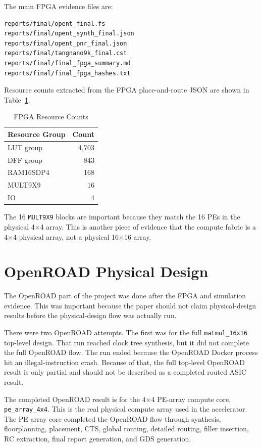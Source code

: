 \documentclass[conference]{IEEEtran}
\begin{document}
The main FPGA evidence files are:

\begin{verbatim}
reports/final/opent_final.fs
reports/final/opent_synth_final.json
reports/final/opent_pnr_final.json
reports/final/tangnano9k_final.cst
reports/final/final_fpga_summary.md
reports/final/final_fpga_hashes.txt
\end{verbatim}

Resource counts extracted from the FPGA place-and-route JSON are shown in Table~\ref{tab:fpga}.

\begin{table}[h]
\centering
\caption{FPGA Resource Counts}
\label{tab:fpga}
\begin{tabular}{lr}
\toprule
Resource Group & Count \\
\midrule
LUT group & 4,703 \\
DFF group & 843 \\
RAM16SDP4 & 168 \\
MULT9X9 & 16 \\
IO & 4 \\
\bottomrule
\end{tabular}
\end{table}

The 16 \texttt{MULT9X9} blocks are important because they match the 16 PEs in the physical 4$\times$4 array. This is another piece of evidence that the compute fabric is a 4$\times$4 physical array, not a physical 16$\times$16 array.

\section{OpenROAD Physical Design}

The OpenROAD part of the project was done after the FPGA and simulation evidence. This was important because the paper should not claim physical-design results before the physical-design flow was actually run.

There were two OpenROAD attempts. The first was for the full \texttt{matmul\_16x16} top-level design. That run reached clock tree synthesis, but it did not complete the full OpenROAD flow. The run ended because the OpenROAD Docker process hit an illegal-instruction crash. Because of that, the full top-level OpenROAD result is only partial and should not be described as a completed routed ASIC result.

The completed OpenROAD result is for the 4$\times$4 PE-array compute core, \texttt{pe\_array\_4x4}. This is the real physical compute array used in the accelerator. The PE-array core completed the OpenROAD flow through synthesis, floorplanning, placement, CTS, global routing, detailed routing, filler insertion, RC extraction, final report generation, and GDS generation.
\end{document}
